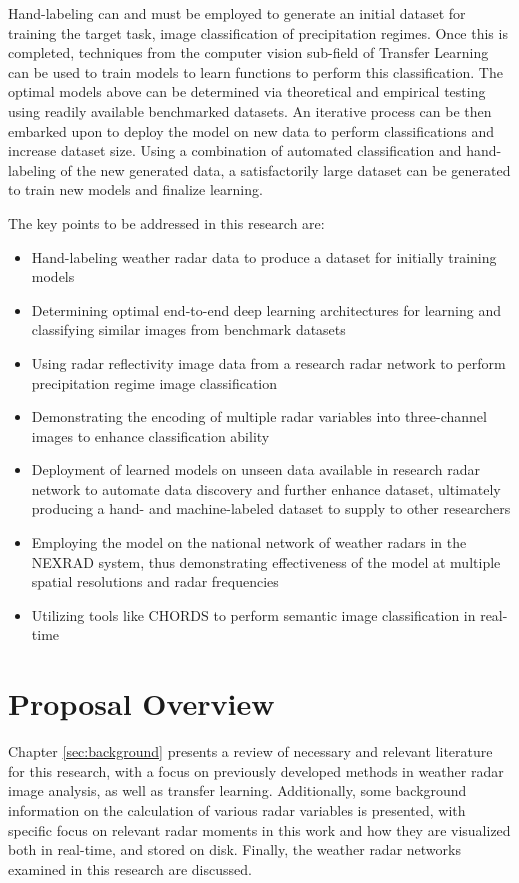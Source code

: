 Hand-labeling can and must be employed to generate an initial dataset for training the target task, image classification of precipitation regimes.
Once this is completed, techniques from the computer vision sub-field of Transfer Learning can be used to train models to learn functions to perform this classification.
The optimal models above can be determined via theoretical and empirical testing using readily available benchmarked datasets.
An iterative process can be then embarked upon to deploy the model on new data to perform classifications and increase dataset size.
Using a combination of automated classification and hand-labeling of the new generated data, a satisfactorily large dataset can be generated to train new models and finalize learning.

The key points to be addressed in this research are:
\begin{itemize}
	\item Hand-labeling weather radar data to produce a dataset for initially training models
	\item Determining optimal end-to-end deep learning architectures for learning and classifying similar images from benchmark datasets
	\item Using radar reflectivity image data from a research radar network to perform precipitation regime image classification
	\item Demonstrating the encoding of multiple radar variables into three-channel images to enhance classification ability
	\item Deployment of learned models on unseen data available in research radar network to automate data discovery and further enhance dataset, ultimately producing a hand- and machine-labeled dataset to supply to other researchers
	\item Employing the model on the national network of weather radars in the NEXRAD system, thus demonstrating effectiveness of the model at multiple spatial resolutions and radar frequencies
	\item Utilizing tools like CHORDS to perform semantic image classification in real-time
\end{itemize}

\section{Proposal Overview}
\label{sec:introduction_overview}

Chapter \ref{sec:background} presents a review of necessary and relevant literature for this research, with a focus on previously developed methods in weather radar image analysis, as well as transfer learning. 
Additionally, some background information on the calculation of various radar variables is presented, with specific focus on relevant radar moments in this work and how they are visualized both in real-time, and stored on disk.
Finally, the weather radar networks examined in this research are discussed.

